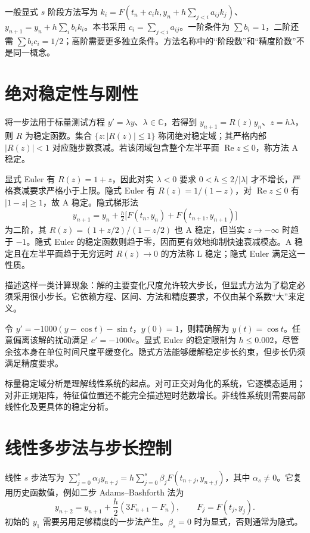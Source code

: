 \documentclass[UTF8,12pt,a4paper,fontset=fandol]{ctexbook}
\begin{document}
一般显式 $s$ 阶段方法写为 $k_i=F(t_n+c_ih,y_n+h\sum_{j<i}a_{ij}k_j)$、$y_{n+1}=y_n+h\sum_i b_ik_i$。本书采用 $c_i=\sum_{j<i}a_{ij}$。一阶条件为 $\sum b_i=1$，二阶还需 $\sum b_ic_i=1/2$；高阶需要更多独立条件。方法名称中的“阶段数”和“精度阶数”不是同一概念。

\section{绝对稳定性与刚性}
\label{sec:na-ode-stability}
\begin{definition}[稳定函数与绝对稳定域]
将一步法用于标量测试方程 $y'=\lambda y$、$\lambda\in\mathbb C$，若得到 $y_{n+1}=R(z)y_n$、$z=h\lambda$，则 $R$ 为稳定函数。集合 $\{z:|R(z)|\le1\}$ 称闭绝对稳定域；其严格内部 $|R(z)|<1$ 对应随步数衰减。若该闭域包含整个左半平面 $\operatorname{Re}z\le0$，称方法 A 稳定。
\end{definition}

显式 Euler 有 $R(z)=1+z$，因此对实 $\lambda<0$ 要求 $0<h\le2/|\lambda|$ 才不增长，严格衰减要求严格小于上限。隐式 Euler 有 $R(z)=1/(1-z)$，对 $\operatorname{Re}z\le0$ 有 $|1-z|\ge1$，故 A 稳定。隐式梯形法
\[
 y_{n+1}=y_n+\tfrac h2\bigl[F(t_n,y_n)+F(t_{n+1},y_{n+1})\bigr]
\]
为二阶，其 $R(z)=(1+z/2)/(1-z/2)$ 也 A 稳定，但当实 $z\to-\infty$ 时趋于 $-1$。隐式 Euler 的稳定函数则趋于零，因而更有效地抑制快速衰减模态。A 稳定且在左半平面趋于无穷远时 $R(z)\to0$ 的方法称 L 稳定；隐式 Euler 满足这一性质。

描述这样一类计算现象：解的主要变化尺度允许较大步长，但显式方法为了稳定必须采用很小步长。它依赖方程、区间、方法和精度要求，不仅由某个系数“大”来定义。

\begin{example}[平滑解与快速扰动模态]
令 $y'=-1000(y-\cos t)-\sin t$，$y(0)=1$，则精确解为 $y(t)=\cos t$。任意偏离该解的扰动满足 $e'=-1000e$。显式 Euler 的稳定限制为 $h\le0.002$，尽管余弦本身在单位时间尺度平缓变化。隐式方法能够缓解稳定步长约束，但步长仍须满足精度要求。
\end{example}

标量稳定域分析是理解线性系统的起点。对可正交对角化的系统，它逐模态适用；对非正规矩阵，特征值位置还不能完全描述短时范数增长。非线性系统则需要局部线性化及更具体的稳定分析。

\section{线性多步法与步长控制}
线性 $s$ 步法写为 $\sum_{j=0}^s\alpha_jy_{n+j}=h\sum_{j=0}^s\beta_jF(t_{n+j},y_{n+j})$，其中 $\alpha_s\ne0$。它复用历史函数值，例如二步 Adams--Bashforth 法为
\[
 y_{n+2}=y_{n+1}+\frac h2(3F_{n+1}-F_n),\qquad F_j=F(t_j,y_j).
\]
初始的 $y_1$ 需要另用足够精度的一步法产生。$\beta_s=0$ 时为显式，否则通常为隐式。
\end{document}

